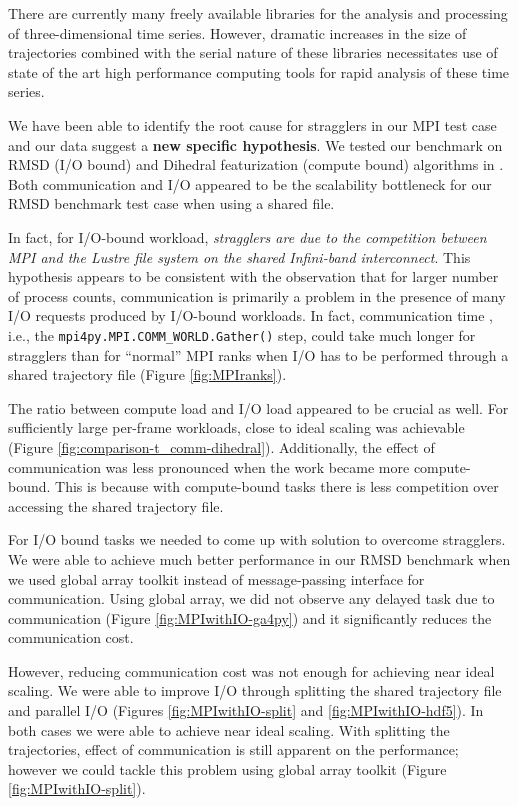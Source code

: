 \label{concl}
There are currently many freely available libraries for the analysis and processing of three-dimensional time series.
However, dramatic increases in the size of trajectories combined with the serial nature of these libraries necessitates 
use of state of the art high performance computing tools for rapid analysis of these time series. 

We have been able to identify the root cause for stragglers in our MPI test case and our data suggest a \textbf{new specific hypothesis}. 
We tested our benchmark on RMSD (I/O bound) and Dihedral featurization (compute bound) algorithms in .
Both communication and I/O appeared to be the scalability bottleneck for our RMSD benchmark test case when using a shared file.

In fact, for I/O-bound workload, \emph{stragglers are due to the competition between MPI and the Lustre file system on the shared Infini-band interconnect}. 
This hypothesis appears to be consistent with the observation that for larger number of process counts, communication is primarily a problem in
the presence of many I/O requests produced by I/O-bound workloads.
In fact, communication time \tcomm, i.e., the \texttt{mpi4py.MPI.COMM\_WORLD.Gather()} step, could take
much longer for stragglers than for ``normal'' MPI ranks when I/O has to be performed through a shared trajectory file (Figure \ref{fig:MPIranks}). 

The ratio between compute load and I/O load appeared to be crucial as well. 
For sufficiently large per-frame workloads, close to ideal scaling was achievable (Figure \ref{fig:comparison-t_comm-dihedral}). 
Additionally, the effect of communication was less pronounced when the work became more compute-bound.
This is because with compute-bound tasks there is less competition over accessing the shared trajectory file.

For I/O bound tasks we needed to come up with solution to overcome stragglers. 
We were able to achieve much better performance in our RMSD benchmark when we used global array toolkit instead of message-passing interface for communication. 
Using global array, we did not observe any delayed task due to communication (Figure \ref{fig:MPIwithIO-ga4py}) and it significantly reduces the communication cost. 

However, reducing communication cost was not enough for achieving near ideal scaling.
We were able to improve I/O through splitting the shared trajectory file and parallel I/O (Figures \ref{fig:MPIwithIO-split} and \ref{fig:MPIwithIO-hdf5}). 
In both cases we were able to achieve near ideal scaling.
With splitting the trajectories, effect of communication is still apparent on the performance; however we could tackle this problem using 
global array toolkit (Figure \ref{fig:MPIwithIO-split}).


